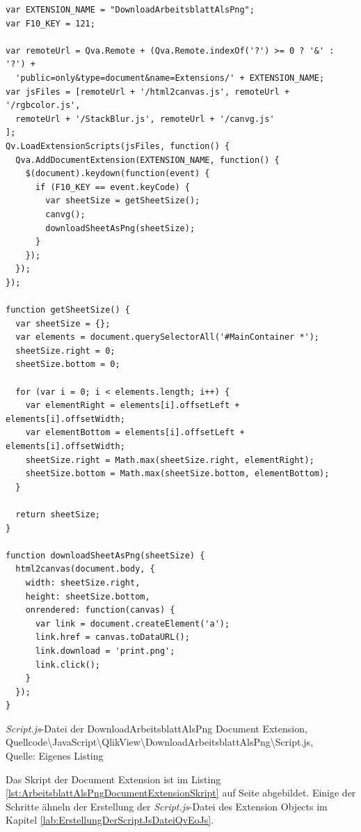 \begin{listing}[htbp]
\begin{verbatim}
var EXTENSION_NAME = "DownloadArbeitsblattAlsPng";
var F10_KEY = 121;

var remoteUrl = Qva.Remote + (Qva.Remote.indexOf('?') >= 0 ? '&' : '?') +
  'public=only&type=document&name=Extensions/' + EXTENSION_NAME;
var jsFiles = [remoteUrl + '/html2canvas.js', remoteUrl + '/rgbcolor.js',
  remoteUrl + '/StackBlur.js', remoteUrl + '/canvg.js'
];
Qv.LoadExtensionScripts(jsFiles, function() {
  Qva.AddDocumentExtension(EXTENSION_NAME, function() {
    $(document).keydown(function(event) {
      if (F10_KEY == event.keyCode) {
        var sheetSize = getSheetSize();
        canvg();
        downloadSheetAsPng(sheetSize);
      }
    });
  });
});

function getSheetSize() {
  var sheetSize = {};
  var elements = document.querySelectorAll('#MainContainer *');
  sheetSize.right = 0;
  sheetSize.bottom = 0;

  for (var i = 0; i < elements.length; i++) {
    var elementRight = elements[i].offsetLeft + elements[i].offsetWidth;
    var elementBottom = elements[i].offsetLeft + elements[i].offsetWidth;
    sheetSize.right = Math.max(sheetSize.right, elementRight);
    sheetSize.bottom = Math.max(sheetSize.bottom, elementBottom);
  }

  return sheetSize;
}

function downloadSheetAsPng(sheetSize) {
  html2canvas(document.body, {
    width: sheetSize.right,
    height: sheetSize.bottom,
    onrendered: function(canvas) {
      var link = document.createElement('a');
      link.href = canvas.toDataURL();
      link.download = 'print.png';
      link.click();
    }
  });
}
\end{verbatim}
\caption[\textit{Script.js}-Datei der DownloadArbeitsblattAlsPng Document Extension]{\textit{Script.js}-Datei der DownloadArbeitsblattAlsPng Document Extension, \\Quellcode\textbackslash{}JavaScript\textbackslash{}QlikView\textbackslash{}DownloadArbeitsblattAlsPng\textbackslash{}Script.js, \\Quelle: Eigenes Listing}
\label{lst:ArbeitsblattAlsPngDocumentExtensionSkript}
\end{listing}


Das Skript der Document Extension ist im Listing \ref{lst:ArbeitsblattAlsPngDocumentExtensionSkript} auf Seite \pageref{lst:ArbeitsblattAlsPngDocumentExtensionSkript} abgebildet. Einige der Schritte ähneln der Erstellung der \textit{Script.js}-Datei des Extension Objects im Kapitel \ref{lab:ErstellungDerScriptJsDateiQvEoJs}.

